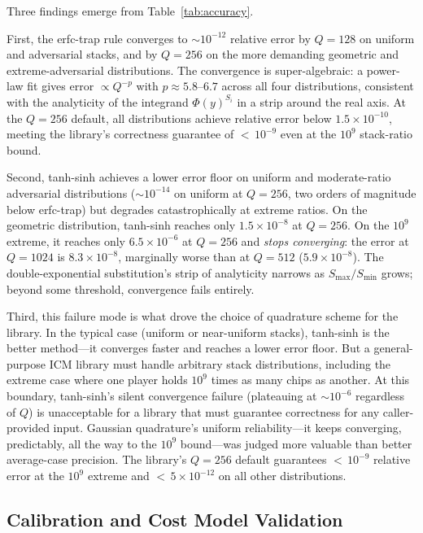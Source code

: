 \documentclass[11pt]{article}
\begin{document}
Three findings emerge from Table~\ref{tab:accuracy}.

First, the erfc-trap rule converges to ${\sim}10^{-12}$ relative error by
$Q = 128$ on uniform and adversarial stacks, and by $Q = 256$ on the more
demanding geometric and extreme-adversarial distributions. The convergence is
super-algebraic: a power-law fit gives error $\propto Q^{-p}$ with
$p \approx 5.8$--$6.7$ across all four distributions, consistent with the
analyticity of the integrand $\Phi(y)^{S_i}$ in a strip around the real axis.
At the $Q = 256$ default, all distributions achieve relative error below
$1.5 \times 10^{-10}$, meeting the library's correctness guarantee of
${<}\,10^{-9}$ even at the $10^9$ stack-ratio bound.

Second, tanh-sinh achieves a lower error floor on uniform and moderate-ratio
adversarial distributions (${\sim}10^{-14}$ on uniform at $Q = 256$, two
orders of magnitude below erfc-trap) but degrades catastrophically at extreme
ratios. On the geometric distribution, tanh-sinh reaches only $1.5 \times
10^{-8}$ at $Q = 256$. On the $10^9$ extreme, it reaches only $6.5 \times
10^{-6}$ at $Q = 256$ and \emph{stops converging}: the error at $Q = 1024$
is $8.3 \times 10^{-8}$, marginally worse than at $Q = 512$
($5.9 \times 10^{-8}$). The double-exponential substitution's strip of
analyticity narrows as $S_{\max}/S_{\min}$ grows; beyond some threshold,
convergence fails entirely.

Third, this failure mode is what drove the choice of quadrature scheme for the
library. In the typical case (uniform or near-uniform stacks), tanh-sinh is
the better method---it converges faster and reaches a lower error floor. But
a general-purpose ICM library must handle arbitrary stack distributions,
including the extreme case where one player holds $10^9$ times as many chips
as another. At this boundary, tanh-sinh's silent convergence failure
(plateauing at ${\sim}10^{-6}$ regardless of $Q$) is unacceptable for a
library that must guarantee correctness for any caller-provided input.
Gaussian quadrature's uniform reliability---it keeps converging, predictably,
all the way to the $10^9$ bound---was judged more valuable than better
average-case precision. The library's $Q = 256$ default guarantees
${<}\,10^{-9}$ relative error at the $10^9$ extreme and ${<}\,5 \times
10^{-12}$ on all other distributions.

\subsection{Calibration and Cost Model Validation}
\end{document}
